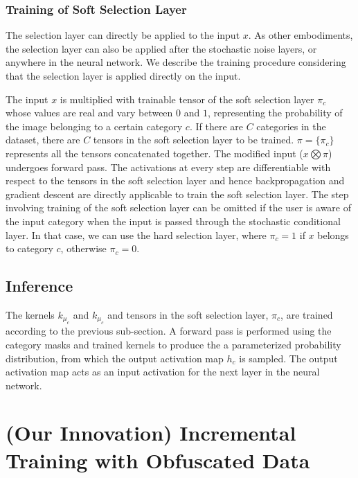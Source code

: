 \documentclass[12pt, letterpaper]{article}
\begin{document}
\subsubsection{Training of Soft Selection Layer}
The selection layer can directly be applied to the input $x$. As other embodiments, the selection layer can also be applied after the stochastic noise layers, or anywhere in the neural network. We describe the training procedure considering that the selection layer is applied directly on the input.

The input $x$ is multiplied with trainable tensor of the soft selection layer $\pi_c$ whose values are real and vary between $0$ and $1$, representing the probability of the image belonging to a certain category $c$. If there are $C$ categories in the dataset, there are $C$ tensors in the soft selection layer to be trained. $\pi=\{\pi_c\}$ represents all the tensors concatenated together. The modified input ($x \bigotimes \pi$) undergoes forward pass. The activations at every step are differentiable with respect to the tensors in the soft selection layer and hence backpropagation and gradient descent are directly applicable to train the soft selection layer.
The step involving training of the soft selection layer can be omitted if the user is aware of the input category when the input is passed through the stochastic conditional layer. In that case, we can use the hard selection layer, where $\pi_c=1$ if $x$ belongs to category $c$, otherwise $\pi_c=0$. 

\subsection{Inference}
The kernels $k_{\mu_c}$ and $k_{\mu_c}$ and tensors in the soft selection layer, $\pi_c$, are trained according to the previous sub-section. A forward pass is performed using the category masks and trained kernels to produce the a parameterized probability distribution, from which the output activation map $h_c$ is sampled. The output activation map acts as an input activation for the next layer in the neural network. 

\section{(Our Innovation) Incremental Training with Obfuscated Data}
\label{sec:fed}
\end{document}
